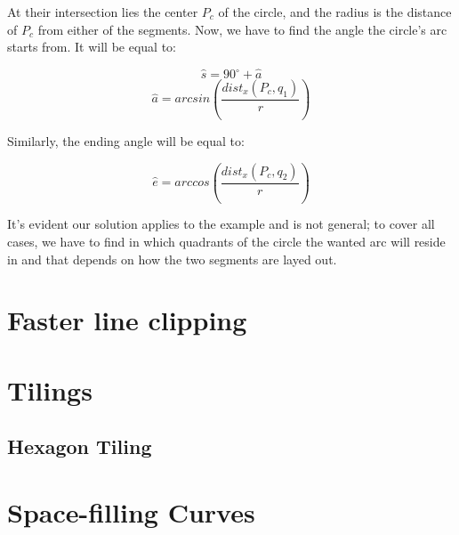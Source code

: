 \documentclass[12pt,openany,a4,usenames,dvipsnames]{book}
\begin{document}
\noindent{}At their intersection lies the center $P_c$ of the circle, and the radius is the distance of $P_c$ from either of the segments. Now, we have to find the angle the circle's arc starts from. It will be equal to:

$$\hat{s} = 90^{\circ} + \hat{a}$$
$$\hat{a} = arcsin\left(\frac{dist_x(P_c, q_1)}{r}\right)$$

\noindent{}Similarly, the ending angle \textbf{\textcolor{white}{\cm{}\LARGE{}}} will be equal to:

$$\hat{e} = arccos\left(\frac{dist_x(P_c, q_2)}{r}\right)$$

\noindent{}It's evident our solution applies to the example and is not general; to cover all cases, we have to find in which quadrants of the circle the wanted arc will reside in and that depends on how the two segments are layed out.

\chapter{Faster line clipping}
\skelpar%
\chapter{Tilings}
\section{Hexagon Tiling}
\chapter{Space-filling Curves}
\skelpar%
\clearpage{}
\end{document}
